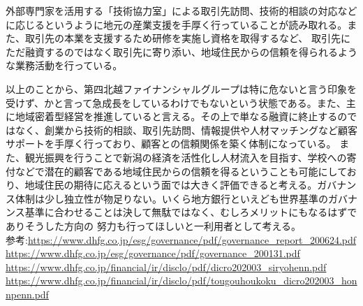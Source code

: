 \documentclass[11pt]{jsarticle}
\begin{document}
    外部専門家を活用する「技術協力室」による取引先訪問、技術的相談の対応などに応じるというように地元の産業支援を手厚く行っていることが読み取れる。また、取引先の本業を支援するため研修を実施し資格を取得するなど、
    取引先にただ融資するのではなく取引先に寄り添い、地域住民からの信頼を得られるような業務活動を行っている。
    \par 以上のことから、第四北越ファイナンシャルグループは特に危ないと言う印象を受けず、かと言って急成長をしているわけでもないという状態である。また、主に地域密着型経営を推進していると言える。その上で単なる融資に終止するのではなく、創業から技術的相談、取引先訪問、情報提供や人材マッチングなど顧客サポートを手厚く行っており、顧客との信頼関係を築く体制になっている。
    また、観光振興を行うことで新潟の経済を活性化し人材流入を目指す、学校への寄付などで潜在的顧客である地域住民からの信頼を得るということも可能にしており、地域住民の期待に応えるという面では大きく評価できると考える。ガバナンス体制は少し独立性が物足りない。いくら地方銀行といえども世界基準のガバナンス基準に合わせることは決して無駄ではなく、むしろメリットにもなるはずでありそうした方向の
    努力も行ってほしいと一利用者として考える。\\
参考:\url{https://www.dhfg.co.jp/esg/governance/pdf/governance_report_200624.pdf}\\
    \url{https://www.dhfg.co.jp/esg/governance/pdf/governance_200131.pdf}\\
    \url{https://www.dhfg.co.jp/financial/ir/disclo/pdf/dicro202003_siryohenn.pdf}\\
    \url{https://www.dhfg.co.jp/financial/ir/disclo/pdf/tougouhoukoku_dicro202003_honnpenn.pdf}
\end{document}

